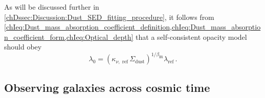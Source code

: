 As will be discussed further in \cref{chDssec:Discussion:Dust_SED_fitting_procedure}, it follows from \cref{chIeq:Dust_mass_absorption_coefficient_definition,chIeq:Dust_mass_absorption_coefficient_form,chIeq:Optical_depth} that a self-consistent opacity model should obey
\begin{equation}
    \label{chIeq:Consistent_l0}
    \lambda_0 = \left( \kappa_{\nu, \text{ ref}} \, \Sigma_\text{dust} \right)^{1/\beta_\text{IR}} \lambda_\text{ref} \, .
\end{equation}

\subsection{Observing galaxies across cosmic time}
\label{chIssec:Observing_galaxies_across_cosmic_time}

